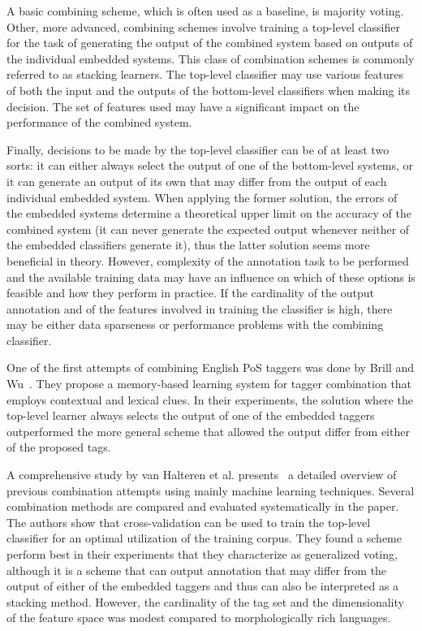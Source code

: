 A basic combining scheme, which is often used as a baseline, is majority voting.
Other, more advanced, combining schemes involve training a top-level classifier for the task of generating the output of the combined system based on outputs of the individual embedded systems.
This class of combination schemes is commonly referred to as stacking learners.
The top-level classifier may use various features of both the input and the outputs of the bottom-level classifiers when making its decision.
The set of features used may have a significant impact on the performance of the combined system.

Finally, decisions to be made by the top-level classifier can be of at least two sorts: it can either always select the output of one of the bottom-level systems, or it can generate an output of its own that may differ from the output of each individual embedded system.
When applying the former solution, the errors of the embedded systems determine a theoretical upper limit on the accuracy of the combined system (it can never generate the expected output whenever neither of the embedded classifiers generate it), thus the latter solution seems more beneficial in theory.
However, complexity of the annotation task to be performed and the available training data may have an influence on which of these options is feasible and how they perform in practice.
If the cardinality of the output annotation and of the features involved in training the classifier is high, there may be either data sparseness or performance problems with the combining classifier.

One of the first attempts of combining English PoS taggers was done by Brill and Wu~\cite{}.
They propose a memory-based learning system for tagger combination that employs contextual and lexical clues.
In their experiments, the solution where the top-level learner always selects the output of one of the embedded taggers outperformed the more general scheme that allowed the output differ from either of the proposed tags.

A comprehensive study by van Halteren et al. presents~\cite{} a detailed overview of previous combination attempts using mainly machine learning techniques.
Several combination methods are compared and evaluated systematically in the paper.
The authors show that cross-validation can be used to train the top-level classifier for an optimal utilization of the training corpus.
They found a scheme perform best in their experiments that they characterize as generalized voting, although it is a scheme that can output annotation that may differ from the output of either of the embedded taggers and thus can also be interpreted as a stacking method.
However, the cardinality of the tag set and the dimensionality of the feature space was modest compared to morphologically rich languages.

